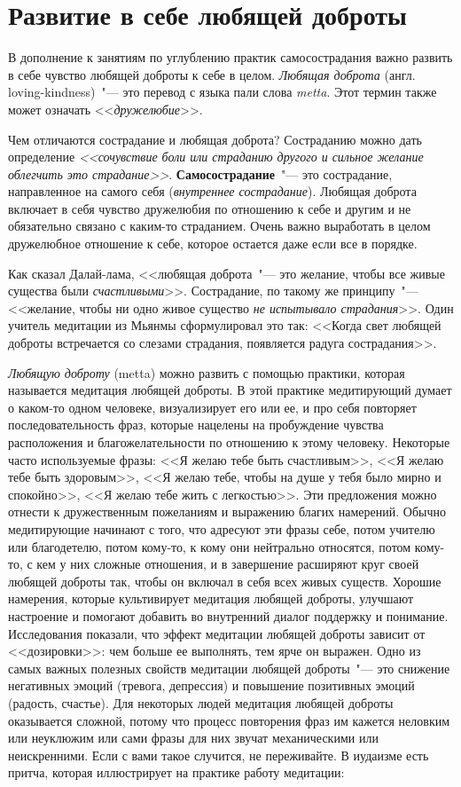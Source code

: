 
\chapter{Развитие в себе любящей доброты} \label{Developing_Loving-Kindness}

В дополнение к занятиям по углублению практик самосострадания важно развить в себе чувство любящей доброты к себе в целом. \emph{Любящая доброта} (англ. loving-kindness)~"--- это перевод с языка пали слова \emph{metta}. Этот термин также может означать <<\emph{дружелюбие}>>.

Чем отличаются сострадание и любящая доброта? Состраданию можно дать определение \emph{<<сочувствие боли или страданию другого и сильное желание облегчить это страдание>>}. \textbf{Самосострадание}~"--- это сострадание, направленное на самого себя (\emph{внутреннее сострадание}). Любящая доброта включает в себя чувство дружелюбия по отношению к себе и другим и не обязательно связано с каким-то страданием. Очень важно выработать в целом дружелюбное отношение к себе, которое остается даже если все в порядке.

Как сказал Далай-лама, <<любящая доброта~"--- это желание, чтобы все живые существа были \emph{счастливыми}>>. Сострадание, по такому же принципу~"--- <<желание, чтобы ни одно живое существо \emph{не испытывало страдания}>>. Один учитель медитации из Мьянмы сформулировал это так: <<Когда свет любящей доброты встречается со слезами страдания, появляется радуга сострадания>>.

\emph{Любящую доброту} (metta) можно развить с помощью практики, которая называется медитация любящей доброты. В этой практике медитирующий думает о каком-то одном человеке, визуализирует его или ее, и про себя повторяет последовательность фраз, которые нацелены на пробуждение чувства расположения и благожелательности по отношению к этому человеку. Некоторые часто используемые фразы: <<Я желаю тебе быть счастливым>>, <<Я желаю тебе быть здоровым>>, <<Я желаю тебе, чтобы на душе у тебя было мирно и спокойно>>, <<Я желаю тебе жить с легкостью>>. Эти предложения можно отнести к дружественным пожеланиям и выражению благих намерений. Обычно медитирующие начинают с того, что адресуют эти фразы себе, потом учителю или благодетелю, потом кому-то, к кому они нейтрально относятся, потом кому-то, с кем у них сложные отношения, и в завершение расширяют круг своей любящей доброты так, чтобы он включал в себя всех живых существ. Хорошие намерения, которые культивирует медитация любящей доброты, улучшают настроение и помогают добавить во внутренний диалог поддержку и понимание. Исследования показали, что эффект медитации любящей доброты зависит от <<дозировки>>: чем больше ее выполнять, тем ярче он выражен. Одно из самых важных полезных свойств медитации любящей доброты~"--- это снижение негативных эмоций (тревога, депрессия) и повышение позитивных эмоций (радость, счастье). Для некоторых людей медитация любящей доброты оказывается сложной, потому что процесс повторения фраз им кажется неловким или неуклюжим или сами фразы для них звучат механическими или неискренними. Если с вами такое случится, не переживайте. В иудаизме есть притча, которая иллюстрирует на практике работу медитации:

